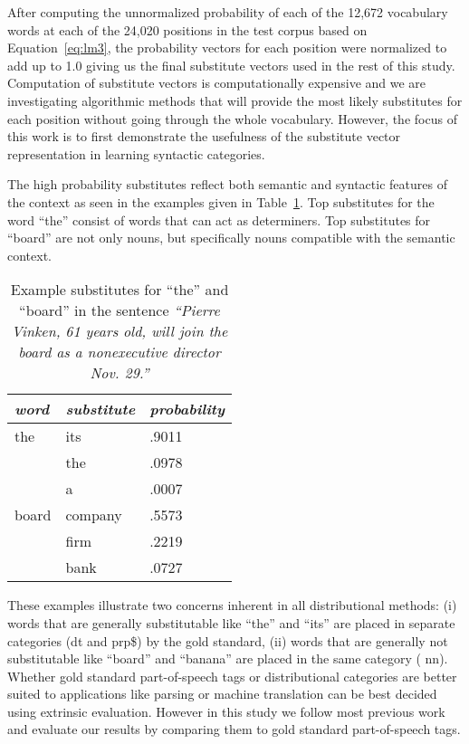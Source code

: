 After computing the unnormalized probability of each of the 12,672
vocabulary words at each of the 24,020 positions in the test corpus
based on Equation~\ref{eq:lm3}, the probability vectors for each
position were normalized to add up to 1.0 giving us the final
substitute vectors used in the rest of this study.  Computation of
substitute vectors is computationally expensive and we are
investigating algorithmic methods that will provide the most likely
substitutes for each position without going through the whole
vocabulary.  However, the focus of this work is to first demonstrate
the usefulness of the substitute vector representation in learning
syntactic categories.

The high probability substitutes reflect both semantic and syntactic
features of the context as seen in the examples given in
Table~\ref{tab:subs}.  Top substitutes for the word ``the'' consist of
words that can act as determiners.  Top substitutes for ``board'' are
not only nouns, but specifically nouns compatible with the semantic
context.

\begin{table}[h]\centering
\begin{tabular}{|l|ll|} \hline
\emph{word} & \emph{substitute} & \emph{probability} \\ \hline
the	& its & .9011 \\
	& the & .0978 \\
	& a & .0007 \\ \hline
board	& company & .5573 \\
	& firm & .2219 \\
	& bank & .0727 \\ \hline
\end{tabular}
\caption{Example substitutes for ``the'' and ``board'' in the sentence {\em ``Pierre Vinken, 61 years old, will join the  board as a nonexecutive director Nov. 29.''}}
\label{tab:subs}
\end{table}

These examples illustrate two concerns inherent in all distributional
methods: (i) words that are generally substitutable like ``the'' and
``its'' are placed in separate categories ({\sc dt} and {\sc prp\$})
by the gold standard, (ii) words that are generally not substitutable
like ``board'' and ``banana'' are placed in the same category ({\sc
  nn}).  Whether gold standard part-of-speech tags or distributional
categories are better suited to applications like parsing or machine
translation can be best decided using extrinsic evaluation.  However
in this study we follow most previous work and evaluate our results by
comparing them to gold standard part-of-speech tags.
